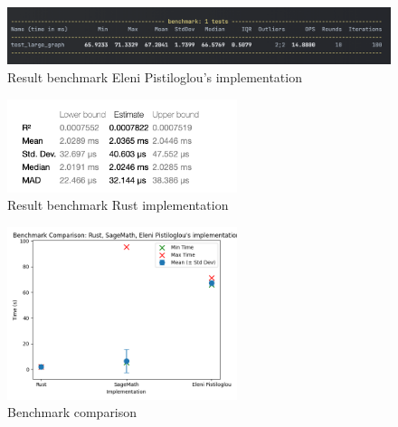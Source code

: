 \begin{figure}[!h]
    \centering
    \includegraphics[width=1\textwidth]{images/benchmark/large_graph/benchmark_large_graph_python}
    \caption{Result benchmark Eleni Pistiloglou's implementation}
    \label{fig:benchmark-large-graph-python}
\end{figure}

\begin{figure}[!h]
    \centering
    \includegraphics[width=0.60\textwidth]{images/benchmark/large_graph/benchmark_large_graph_rust}
    \caption{Result benchmark Rust implementation}
    \label{fig:benchmark-large-graph-rust}
\end{figure}

\begin{figure}[!h]
    \centering
    \includegraphics[width=0.60\textwidth]{images/benchmark/large_graph/benchmark_comparison_graph_100_1058}
    \caption{Benchmark comparison}
    \label{fig:benchmark-comparison-graph-100-1058}
\end{figure}


